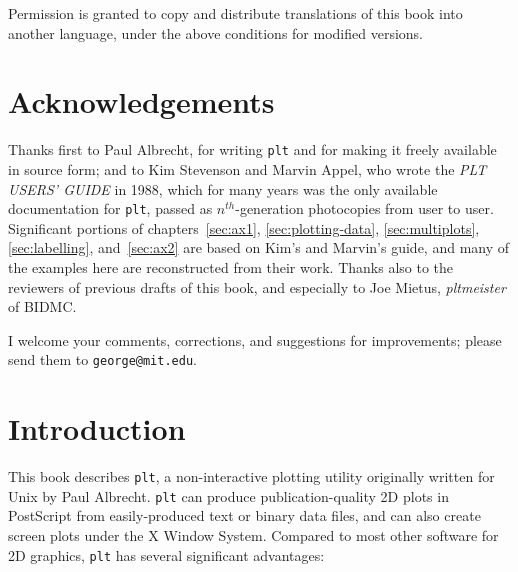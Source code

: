 \documentclass{book}
\begin{document}
\vspace{3mm}

\noindent
Permission is granted to copy and distribute translations of this book into
another language, under the above conditions for modified versions.

\newpage
\setcounter{page}{1}
\tableofcontents

\newpage
\listoffigures

\chapter*{Acknowledgements}
\markboth{}{}

%
%
%
%
%
%
Thanks first to Paul Albrecht, for writing {\tt plt} and for making it
freely available in source form; and to Kim Stevenson and Marvin
Appel, who wrote the {\em PLT USERS' GUIDE} in 1988, which for many
years was the only available documentation for {\tt plt}, passed as
$n^{th}$-generation photocopies from user to user.  Significant
portions of chapters~\ref{sec:ax1}, \ref{sec:plotting-data},
\ref{sec:multiplots}, \ref{sec:labelling}, and~\ref{sec:ax2} are based
on Kim's and Marvin's guide, and many of the examples here are
reconstructed from their work.  Thanks also to the reviewers of
previous drafts of this book, and especially to Joe Mietus, {\em
pltmeister} of BIDMC.

I welcome your comments, corrections, and suggestions for improvements; please
send them to {\tt george@mit.edu}.

\chapter{Introduction}

%
%
%
%
%
%
%
This book describes {\tt plt}, a non-interactive plotting utility originally
written for Unix by Paul Albrecht.  {\tt plt} can produce publication-quality
2D plots in PostScript from easily-produced text or binary data files, and can
also create screen plots under the X Window System.  Compared to most other
software for 2D graphics, {\tt plt} has several significant advantages:
\end{document}
